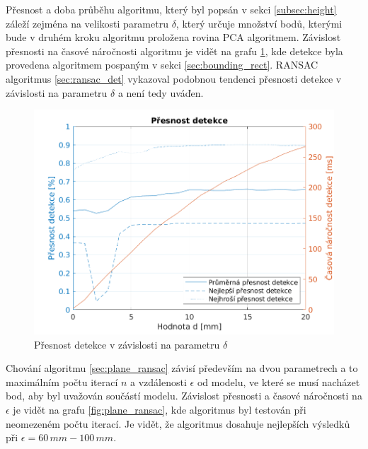 \documentclass[twoside]{ctuthesis}
\begin{document}
Přesnost a doba průběhu algoritmu, který byl popsán v sekci \ref{subsec:height} záleží zejména na velikosti parametru $\delta$, který určuje množství bodů, kterými bude v druhém kroku algoritmu proložena rovina PCA algoritmem. Závislost přesnosti na časové náročnosti algoritmu je vidět na grafu \ref{fig:delta_detekce_normaly}, kde detekce byla provedena algoritmem pospaným v sekci \ref{sec:bounding_rect}. RANSAC algoritmus \ref{sec:ransac_det} vykazoval podobnou tendenci přesnosti detekce v závislosti na parametru $\delta$ a není tedy uváďen.
\begin{figure}
    \centering
    \includegraphics[width = \linewidth]{pictures/normal_acc.png}
    \caption{Přesnost detekce v závislosti na parametru $\delta$}
    \label{fig:delta_detekce_normaly}
\end{figure}

Chování algoritmu \ref{sec:plane_ransac} závisí především na dvou parametrech a to maximálním počtu iterací $n$ a vzdálenosti $\epsilon$ od modelu, ve které se musí nacházet bod, aby byl uvažován součástí modelu. Závislost přesnosti a časové náročnosti na $\epsilon$ je vidět na grafu \ref{fig:plane_ransac}, kde algoritmus byl testován při neomezeném počtu iterací. Je vidět, že algoritmus dosahuje nejlepších výsledků při $\epsilon = 60\,mm - 100\,mm$.
\end{document}
